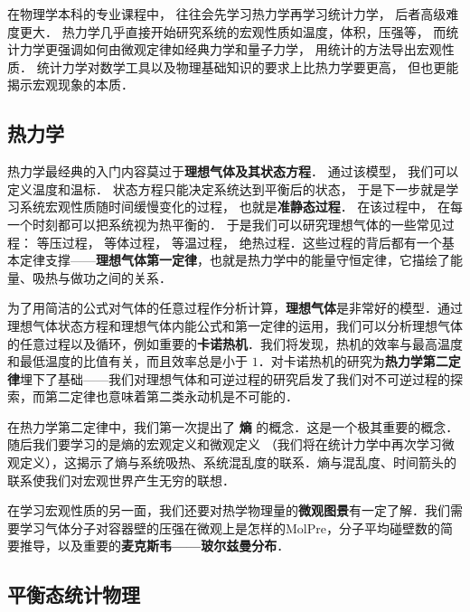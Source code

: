 
\begin{issues}
\issueDraft
\end{issues}

在物理学本科的专业课程中， 往往会先学习热力学再学习统计力学， 后者高级难度更大． 热力学几乎直接开始研究系统的宏观性质如温度，体积，压强等， 而统计力学更强调如何由微观定律如经典力学和量子力学， 用统计的方法导出宏观性质． 统计力学对数学工具以及物理基础知识的要求上比热力学要更高， 但也更能揭示宏观现象的本质．

\subsection{热力学}
热力学最经典的入门内容莫过于\textbf{理想气体及其状态方程}． 通过该模型， 我们可以定义温度和温标． 状态方程只能决定系统达到平衡后的状态， 于是下一步就是学习系统宏观性质随时间缓慢变化的过程， 也就是\textbf{准静态过程}． 在该过程中， 在每一个时刻都可以把系统视为热平衡的． 于是我们可以研究理想气体的一些常见过程： 等压过程， 等体过程， 等温过程， 绝热过程．这些过程的背后都有一个基本定律支撑——\textbf{理想气体第一定律}，也就是热力学中的能量守恒定律，它描绘了能量、吸热与做功之间的关系．

为了用简洁的公式对气体的任意过程作分析计算，\textbf{理想气体}是非常好的模型．通过理想气体状态方程和理想气体内能公式和第一定律的运用，我们可以分析理想气体的任意过程以及循环，例如重要的\textbf{卡诺热机}．我们将发现，热机的效率与最高温度和最低温度的比值有关，而且效率总是小于 $1$．对卡诺热机的研究为\textbf{热力学第二定律}埋下了基础——我们对理想气体和可逆过程的研究启发了我们对不可逆过程的探索，而第二定律也意味着第二类永动机是不可能的．

在热力学第二定律中，我们第一次提出了 \textbf{熵} 的概念．这是一个极其重要的概念．随后我们要学习的是熵的宏观定义和微观定义 （我们将在统计力学中再次学习微观定义），这揭示了熵与系统吸热、系统混乱度的联系．熵与混乱度、时间箭头的联系使我们对宏观世界产生无穷的联想．

在学习宏观性质的另一面，我们还要对热学物理量的\textbf{微观图景}有一定了解．我们需要学习气体分子对容器壁的压强在微观上是怎样的{MolPre}，分子平均碰壁数的简要推导，以及重要的\textbf{麦克斯韦——玻尔兹曼分布}．

\subsection{平衡态统计物理}

